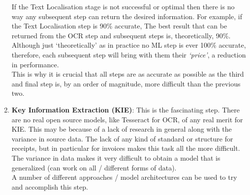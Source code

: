 \begin{enumerate}
	      \bigbreak
	      If the Text Localisation stage is not successful or optimal then there is no way any subsequent step can
	      return the desired information. For example, if the Text Localisation step is 90\% accurate, The best result that can be returned from the OCR step and
	      subsequent steps is, theoretically, 90\%.\\
	      Although just `theoretically' as in practice no ML step is ever 100\% accurate, therefore, each subsequent step will bring with
	      them their \emph{`price'}, a reduction in performance.\\
	      This is why it is crucial that all steps are as accurate as possible as the third and final step is, by an order of magnitude, more difficult
	      than the previous two.
	\item \textbf{Key Information Extraction (KIE)}: This is the fascinating step. There are no real open source models, like Tesseract for OCR, of any
	      real merit for KIE. This may be because of a lack of research in general along with the variance in source data.
	      The lack of any kind of standard or structure for receipts, but in particular for invoices makes this task all the more difficult.
	      The variance in data makes it very difficult to obtain a model that is generalized (can work on all / different forms of data).\\
	      A number of different approaches / model architectures can be used to try and accomplish this step.\\
\end{enumerate}
